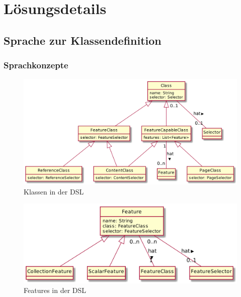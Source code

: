 \chapter{Lösungsdetails}
    \label{chapter:SolutionDetails}


    \section{Sprache zur Klassendefinition}
        \subsection{Sprachkonzepte}
            \begin{figure}
                \centering
                \includegraphics[width=\textwidth]{../resources/dsl/classes.png}
                \caption{Klassen in der DSL}
                \label{image:dslClasses}
            \end{figure}

            \begin{figure}
                \centering
                \includegraphics[width=\textwidth]{../resources/dsl/features.png}
                \caption{Features in der DSL}
                \label{image:dslFeatures}
            \end{figure}

